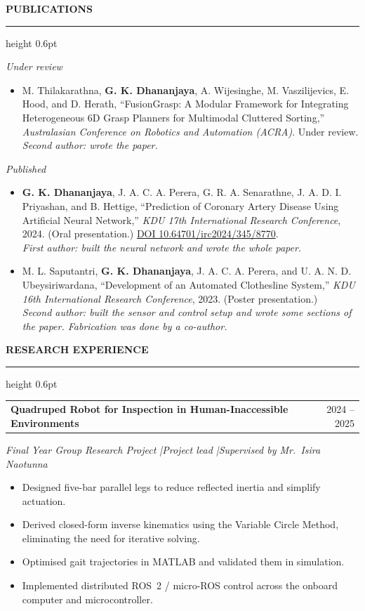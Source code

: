 \documentclass[11pt,letterpaper]{article}
\makeatletter
\renewcommand{\section}[1]{%
  \Needspace{6\baselineskip}%
  \vspace{7pt}%
  {\normalsize\bfseries\MakeUppercase{#1}}\par
  \vspace{1pt}\hrule height 0.6pt
  \vspace{3.5pt}%
}
\newcommand{\cventry}[2]{%
  \vspace{3pt}%
  \noindent\begin{tabularx}{\textwidth}{@{}X r@{}}
    #1 & #2
  \end{tabularx}\par\vspace{-0.5pt}%
}
\newcommand{\cvsub}[1]{{\itshape #1}\par\vspace{1pt}}
\newenvironment{cvlist}
  {\begin{itemize}[leftmargin=1.1em,itemsep=1pt,parsep=0pt,topsep=1.5pt,
                   label=\textendash]}
  {\end{itemize}}
\makeatother
\begin{document}
\section{Publications}

\textit{Under review}
\begin{cvlist}
  \item M. Thilakarathna, \textbf{G. K. Dhananjaya}, A. Wijesinghe, M. Vaszilijevics,
        E. Hood, and D. Herath, ``FusionGrasp: A
        Modular Framework for Integrating Heterogeneous 6D Grasp Planners for
        Multimodal Cluttered Sorting,'' \textit{Australasian Conference on
        Robotics and Automation (ACRA)}. Under review.\\
        \textit{Second author: wrote the paper.}
\end{cvlist}

\vspace{2pt}\textit{Published}
\begin{cvlist}
  \item \textbf{G. K. Dhananjaya}, J. A. C. A. Perera, G. R. A. Senarathne,
        J. A. D. I. Priyashan, and B. Hettige, ``Prediction of Coronary Artery
        Disease Using Artificial Neural Network,'' \textit{KDU 17th
        International Research Conference}, 2024. (Oral presentation.)
        \href{https://doi.org/10.64701/irc2024/345/8770}{DOI 10.64701/irc2024/345/8770}.\\
        \textit{First author: built the neural network and wrote the whole paper.}
  \item M. L. Saputantri, \textbf{G. K. Dhananjaya}, J. A. C. A. Perera, and
        U. A. N. D. Ubeysiriwardana, ``Development of an Automated Clothesline
        System,'' \textit{KDU 16th International Research Conference}, 2023.
        (Poster presentation.)\\
        \textit{Second author: built the sensor and control setup and wrote some
        sections of the paper. Fabrication was done by a co-author.}
\end{cvlist}

\section{Research Experience}

\cventry{\textbf{Quadruped Robot for Inspection in Human-Inaccessible Environments}}{2024 -- 2025}
\cvsub{Final Year Group Research Project \quad|\quad Project lead \quad|\quad Supervised by Mr.\ Isira Naotunna}
\begin{cvlist}
  \item Designed five-bar parallel legs to reduce reflected inertia and
        simplify actuation.
  \item Derived closed-form inverse kinematics using the Variable Circle Method,
        eliminating the need for iterative solving.
  \item Optimised gait trajectories in MATLAB and validated them in simulation.
  \item Implemented distributed ROS~2 / micro-ROS control across the onboard
        computer and microcontroller.
\end{cvlist}
\end{document}
